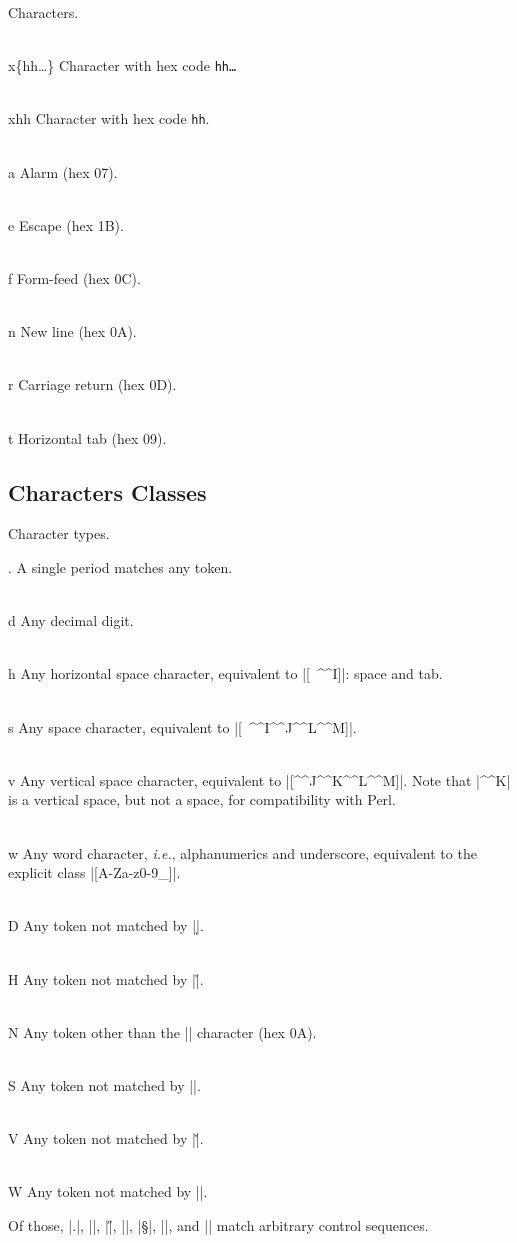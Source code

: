 \documentclass[oneside]{book}
\newenvironment{l3regex-syntax}
  {\begin{itemize}\def\\{\char`\\}\def\makelabel##1{\hss\llap{\ttfamily##1}}}
  {\end{itemize}}
\begin{document}
Characters.
\begin{l3regex-syntax}
  \item[\\x\{hh\ldots{}\}] Character with hex code \texttt{hh\ldots{}}
  \item[\\xhh] Character with hex code \texttt{hh}.
  \item[\\a] Alarm (hex 07).
  \item[\\e] Escape (hex 1B).
  \item[\\f] Form-feed (hex 0C).
  \item[\\n] New line (hex 0A).
  \item[\\r] Carriage return (hex 0D).
  \item[\\t] Horizontal tab (hex 09).
\end{l3regex-syntax}

\subsection{Characters Classes}

Character types.
\begin{l3regex-syntax}
  \item[.] A single period matches any token.
  \item[\\d] Any decimal digit.
  \item[\\h] Any horizontal space character,
    equivalent to |[\ \^^I]|: space and tab.
  \item[\\s] Any space character,
    equivalent to |[\ \^^I\^^J\^^L\^^M]|.
  \item[\\v] Any vertical space character,
    equivalent to |[\^^J\^^K\^^L\^^M]|. Note that |\^^K| is a vertical space,
    but not a space, for compatibility with Perl.
  \item[\\w] Any word character, \emph{i.e.},
    alphanumerics and underscore, equivalent to the explicit
    class |[A-Za-z0-9\_]|.
  \item[\\D] Any token not matched by |\d|.
  \item[\\H] Any token not matched by |\h|.
  \item[\\N] Any token other than the |\n| character (hex 0A).
  \item[\\S] Any token not matched by |\s|.
  \item[\\V] Any token not matched by |\v|.
  \item[\\W] Any token not matched by |\w|.
\end{l3regex-syntax}
Of those, |.|, |\D|, |\H|, |\N|, |\S|, |\V|, and |\W| match arbitrary
control sequences.
\end{document}

